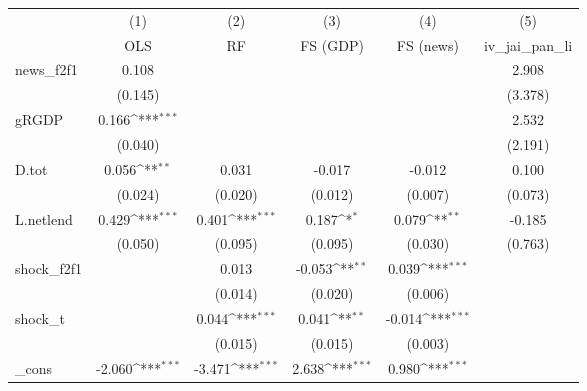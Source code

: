 {
\def\sym#1{\ifmmode^{#1}\else\(^{#1}\)\fi}
\begin{tabular}{l*{5}{c}}
\toprule
            &\multicolumn{1}{c}{(1)}&\multicolumn{1}{c}{(2)}&\multicolumn{1}{c}{(3)}&\multicolumn{1}{c}{(4)}&\multicolumn{1}{c}{(5)}\\
            &\multicolumn{1}{c}{OLS}&\multicolumn{1}{c}{RF}&\multicolumn{1}{c}{FS (GDP)}&\multicolumn{1}{c}{FS (news)}&\multicolumn{1}{c}{iv\_jai\_pan\_li}\\
\midrule
news\_f2f1   &       0.108         &                     &                     &                     &       2.908         \\
            &     (0.145)         &                     &                     &                     &     (3.378)         \\
\addlinespace
gRGDP       &       0.166\sym{***}&                     &                     &                     &       2.532         \\
            &     (0.040)         &                     &                     &                     &     (2.191)         \\
\addlinespace
D.tot       &       0.056\sym{**} &       0.031         &      -0.017         &      -0.012         &       0.100         \\
            &     (0.024)         &     (0.020)         &     (0.012)         &     (0.007)         &     (0.073)         \\
\addlinespace
L.netlend   &       0.429\sym{***}&       0.401\sym{***}&       0.187\sym{*}  &       0.079\sym{**} &      -0.185         \\
            &     (0.050)         &     (0.095)         &     (0.095)         &     (0.030)         &     (0.763)         \\
\addlinespace
shock\_f2f1  &                     &       0.013         &      -0.053\sym{**} &       0.039\sym{***}&                     \\
            &                     &     (0.014)         &     (0.020)         &     (0.006)         &                     \\
\addlinespace
shock\_t     &                     &       0.044\sym{***}&       0.041\sym{**} &      -0.014\sym{***}&                     \\
            &                     &     (0.015)         &     (0.015)         &     (0.003)         &                     \\
\addlinespace
\_cons      &      -2.060\sym{***}&      -3.471\sym{***}&       2.638\sym{***}&       0.980\sym{***}&                     \\

\end{tabular}}
